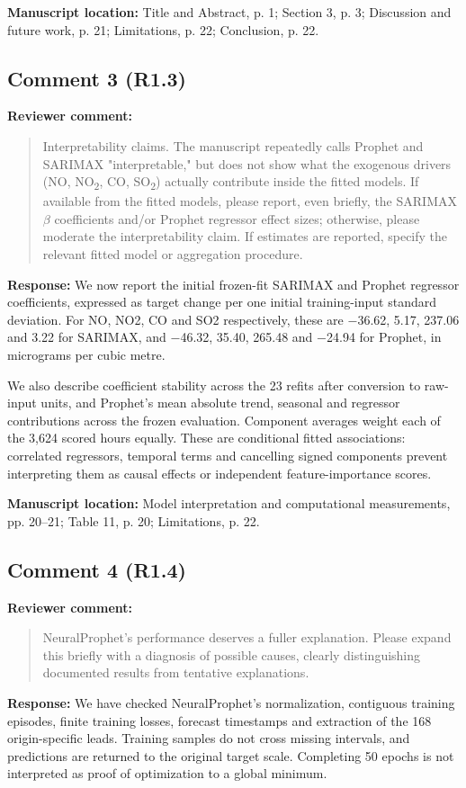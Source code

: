 \documentclass[11pt,a4paper]{article}
\begin{document}
\textbf{Manuscript location:} Title and Abstract, p. 1; Section 3, p. 3; Discussion and future work, p. 21; Limitations, p. 22; Conclusion, p. 22.
\begin{samepage}
\subsection*{Comment 3 (R1.3)}
\textbf{Reviewer comment:}
\begin{quote}\small Interpretability claims. The manuscript repeatedly calls Prophet and SARIMAX "interpretable," but does not show what the exogenous drivers (NO, NO\textsubscript{2}, CO, SO\textsubscript{2}) actually contribute inside the fitted models. If available from the fitted models, please report, even briefly, the SARIMAX $\beta$ coefficients and/or Prophet regressor effect sizes; otherwise, please moderate the interpretability claim. If estimates are reported, specify the relevant fitted model or aggregation procedure.\end{quote}
\end{samepage}
\textbf{Response:}
We now report the initial frozen-fit SARIMAX and Prophet regressor coefficients, expressed as target change per one initial training-input standard deviation. For NO, NO2, CO and SO2 respectively, these are $-$36.62, 5.17, 237.06 and 3.22 for SARIMAX, and $-$46.32, 35.40, 265.48 and $-$24.94 for Prophet, in micrograms per cubic metre.

We also describe coefficient stability across the 23 refits after conversion to raw-input units, and Prophet's mean absolute trend, seasonal and regressor contributions across the frozen evaluation. Component averages weight each of the 3,624 scored hours equally. These are conditional fitted associations: correlated regressors, temporal terms and cancelling signed components prevent interpreting them as causal effects or independent feature-importance scores.

\textbf{Manuscript location:} Model interpretation and computational measurements, pp. 20--21; Table 11, p. 20; Limitations, p. 22.
\begin{samepage}
\subsection*{Comment 4 (R1.4)}
\textbf{Reviewer comment:}
\begin{quote}\small NeuralProphet's performance deserves a fuller explanation. Please expand this briefly with a diagnosis of possible causes, clearly distinguishing documented results from tentative explanations.\end{quote}
\end{samepage}
\textbf{Response:}
We have checked NeuralProphet's normalization, contiguous training episodes, finite training losses, forecast timestamps and extraction of the 168 origin-specific leads. Training samples do not cross missing intervals, and predictions are returned to the original target scale. Completing 50 epochs is not interpreted as proof of optimization to a global minimum.
\end{document}
